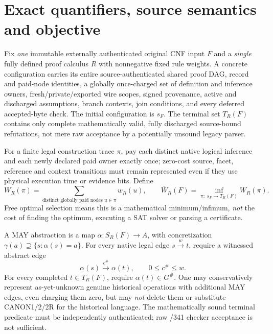 \documentclass[11pt]{article}
\begin{document}
\section*{Exact quantifiers, source semantics and objective}
Fix \emph{one} immutable externally authenticated original CNF input \(F\) and a
\emph{single} fully defined proof calculus \(R\) with nonnegative fixed rule
weights. A concrete configuration carries its entire source-authenticated shared
proof DAG, record and paid-node identities, a globally once-charged set of
definition and inference owners, fresh/private/exported wire scopes,
signed provenance, active and discharged assumptions, branch contexts,
join conditions, and every deferred accepted-byte check. The initial
configuration is \(s_F\). The terminal set \(T_R(F)\) contains only complete
mathematically valid, fully discharged source-bound refutations, not mere
raw acceptance by a potentially unsound legacy parser.

For a finite legal construction trace \(\pi\), pay each distinct native logical
inference and each newly declared paid owner exactly once; zero-cost source,
facet, reference and context transitions must remain represented even if they
use physical execution time or evidence bits. Define
\[
 W_R(\pi)=\sum_{\text{distinct globally paid nodes }u\in \pi} w_R(u),
 \qquad
 \overline W_R(F)=
 \inf_{\pi:\;s_F\longrightarrow T_R(F)} W_R(\pi).
\]
Free optimal selection means this is a mathematical minimum/infimum, \emph{not}
the cost of finding the optimum, executing a SAT solver or parsing a certificate.

A MAY abstraction is a map \(\alpha:S_R(F)\to A\), with concretization
\(\gamma(a)\supseteq\{s:\alpha(s)=a\}\). For every native legal edge
\(s\xrightarrow{w}t\), require a witnessed abstract edge
\[
 \alpha(s)\xrightarrow{c^\#}\alpha(t),\qquad 0\le c^\#\le w.
 \tag{1}
\]
For every completed \(t\in T_R(F)\), require \(\alpha(t)\in G^\#\).
One may conservatively represent as-yet-unknown genuine historical operations
with additional MAY edges, even charging them zero, but may \emph{not}
delete them or substitute CANON1/2/2R for the historical language.
The mathematically sound terminal predicate must be independently
authenticated; raw /341 checker acceptance is not sufficient.
\end{document}
